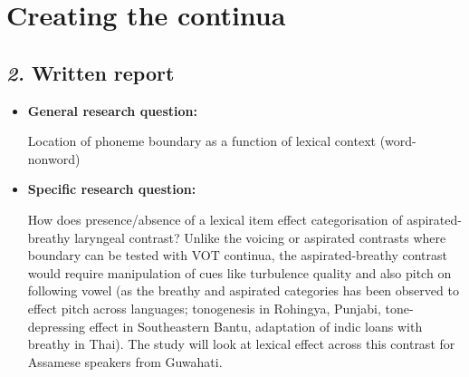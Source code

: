 \documentclass[12pt, english]{article}
\newcommand{\mysection}[2]{\setcounter{section}{#1}\addtocounter{section}{-1}\section{#2}}
\begin{document}

\mysection{9}{Creating the continua}
\vspace{10pt}



\subsection*{\emph{2.} Written report}
\vspace{10pt}

\begin{itemize}
    \item \textbf{General research question:} \par
    Location of phoneme boundary as a function of lexical context (word-nonword)
    \item \textbf{Specific research question:} \par
    How does presence/absence of a lexical item effect categorisation of aspirated-breathy laryngeal contrast? Unlike the voicing or aspirated contrasts where boundary can be tested with VOT continua, the aspirated-breathy contrast would require manipulation of cues like turbulence quality and also pitch on following vowel (as the breathy and aspirated categories has been observed to effect pitch across languages; tonogenesis in Rohingya, Punjabi, tone-depressing effect in Southeastern Bantu, adaptation of indic loans with breathy in Thai). The study will look at lexical effect across this contrast for Assamese speakers from Guwahati.   
\end{itemize}
\end{document}
